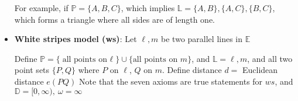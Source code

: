 \documentclass{report}
\begin{document}
\begin{itemize}
        For example, if $\mathbb{P} = \{A,B,C\} $, which implies $\mathbb{L} = \{A,B\}, \{A,C\}, \{B,C\} $, which forms a triangle where all sides are of length one.
    \item \textbf{White stripes model (ws)}: Let $\ell, m$ be two parallel lines in $\mathbb{E}$
        \bigbreak \noindent 
        \begin{figure}[ht]
            \centering
            \label{fig:twolines}
        \end{figure}
        \bigbreak \noindent 
        Define $\mathbb{P} = \{\text{all points on $\ell $}\} \cup \{\text{all points on $m$}\}$, and $\mathbb{L} = \ell,m$, and all two point sets $\{P,Q\}$ where $P$ on $\ell$, $Q$ on $m$. Define distance $d = $ Euclidean distance $e(PQ)$
        \bigbreak \noindent 
        Note that the seven axioms are true statements for $ws$, and $\mathbb{D} = [0,\infty),\ \omega = \infty$
        \bigbreak \noindent 
        \begin{figure}[ht]
            \centering
            \label{fig:twolines2}
        \end{figure}





    \end{itemize}

    \pagebreak 
\end{document}
